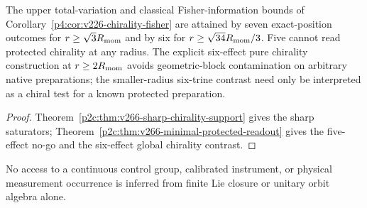 \documentclass[12pt,a4paper]{article}
\begin{document}
\begin{corollary}
\label{p4a:cor:v266-small-chirality-readout}
The upper total-variation and classical Fisher-information bounds of
Corollary~\ref{p4:cor:v226-chirality-fisher} are attained by seven
exact-position outcomes for $r\ge\sqrt3R_{\mathrm{mom}}$ and by six for
$r\ge\sqrt{34}R_{\mathrm{mom}}/3$. Five cannot read protected chirality
at any radius. The explicit six-effect pure chirality construction
at $r\ge2R_{\mathrm{mom}}$ avoids geometric-block contamination on arbitrary
native preparations; the smaller-radius six-trine contrast need only
be interpreted as a chiral test for a known protected preparation.
\end{corollary}
\begin{proof}
Theorem~\ref{p2c:thm:v266-sharp-chirality-support} gives the sharp
saturators; Theorem~\ref{p2c:thm:v266-minimal-protected-readout}
gives the five-effect no-go and the six-effect global chirality contrast.
\end{proof}
No access to a continuous control group, calibrated instrument, or
physical measurement occurrence is inferred from finite Lie closure
or unitary orbit algebra alone.
\end{document}
